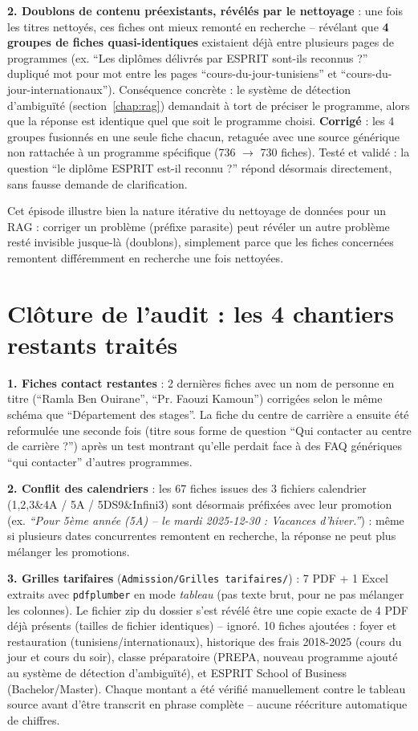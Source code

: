 \documentclass[11pt,a4paper]{report}
\begin{document}
\textbf{2. Doublons de contenu préexistants, révélés par le nettoyage} : une fois les
titres nettoyés, ces fiches ont mieux remonté en recherche -- révélant que
\textbf{4 groupes de fiches quasi-identiques} existaient déjà entre plusieurs pages de
programmes (ex. ``Les diplômes délivrés par ESPRIT sont-ils reconnus ?'' dupliqué mot
pour mot entre les pages ``cours-du-jour-tunisiens'' et ``cours-du-jour-internationaux'').
Conséquence concrète : le système de détection d'ambiguïté (section~\ref{chap:rag})
demandait à tort de préciser le programme, alors que la réponse est identique quel que
soit le programme choisi. \textbf{Corrigé} : les 4 groupes fusionnés en une seule fiche
chacun, retaguée avec une source générique non rattachée à un programme spécifique
(736 $\to$ 730 fiches). Testé et validé : la question ``le diplôme ESPRIT est-il
reconnu ?'' répond désormais directement, sans fausse demande de clarification.

\begin{noteinfo}
Cet épisode illustre bien la nature itérative du nettoyage de données pour un RAG :
corriger un problème (préfixe parasite) peut révéler un autre problème resté invisible
jusque-là (doublons), simplement parce que les fiches concernées remontent différemment
en recherche une fois nettoyées.
\end{noteinfo}

\section{Clôture de l'audit : les 4 chantiers restants traités}

\textbf{1. Fiches contact restantes} : 2 dernières fiches avec un nom de personne en
titre (``Ramla Ben Ouirane'', ``Pr. Faouzi Kamoun'') corrigées selon le même schéma que
``Département des stages''. La fiche du centre de carrière a ensuite été reformulée une
seconde fois (titre sous forme de question ``Qui contacter au centre de carrière ?'')
après un test montrant qu'elle perdait face à des FAQ génériques ``qui contacter''
d'autres programmes.

\textbf{2. Conflit des calendriers} : les 67 fiches issues des 3 fichiers calendrier
(1,2,3\&4A / 5A / 5DS9\&Infini3) sont désormais préfixées avec leur promotion
(ex. \emph{``Pour 5ème année (5A) -- le mardi 2025-12-30 : Vacances d'hiver.''}) : même si
plusieurs dates concurrentes remontent en recherche, la réponse ne peut plus mélanger les
promotions.

\textbf{3. Grilles tarifaires} (\texttt{Admission/Grilles tarifaires/}) : 7 PDF + 1 Excel
extraits avec \texttt{pdfplumber} en mode \emph{tableau} (pas texte brut, pour ne pas
mélanger les colonnes). Le fichier zip du dossier s'est révélé être une copie exacte de 4
PDF déjà présents (tailles de fichier identiques) -- ignoré. 10 fiches ajoutées : foyer et
restauration (tunisiens/internationaux), historique des frais 2018-2025 (cours du jour et
cours du soir), classe préparatoire (PREPA, nouveau programme ajouté au système de
détection d'ambiguïté), et ESPRIT School of Business (Bachelor/Master). Chaque montant a
été vérifié manuellement contre le tableau source avant d'être transcrit en phrase
complète -- aucune réécriture automatique de chiffres.
\end{document}
